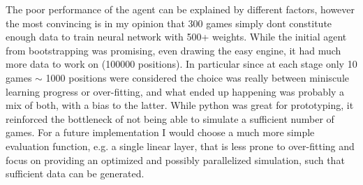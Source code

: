 \documentclass[a4paper,12pt]{article}
\theoremstyle{definition}
\theoremstyle{definition}
\theoremstyle{definition}
\theoremstyle{definition}
\theoremstyle{definition}
\theoremstyle{definition}
\begin{document}
	The poor performance of the agent can be explained by different factors, however the most convincing is in my opinion that 300 games simply dont constitute enough data to train neural network with 500+ weights. While the initial agent from bootstrapping was promising, even drawing the easy engine, it had much more data to work on (100000 positions). In particular since at each stage only 10 games $\sim$ 1000 positions were considered the choice was really between miniscule learning progress or over-fitting, and what ended up happening was probably a mix of both, with a bias to the latter. While python was great for prototyping, it reinforced the bottleneck of not being able to simulate a sufficient number of games. For a future implementation I would choose a much more simple evaluation function, e.g. a single linear layer, that is less prone to over-fitting and focus on providing an optimized and possibly parallelized simulation, such that sufficient data can be generated.
	
	
	
	
	
\end{document}
